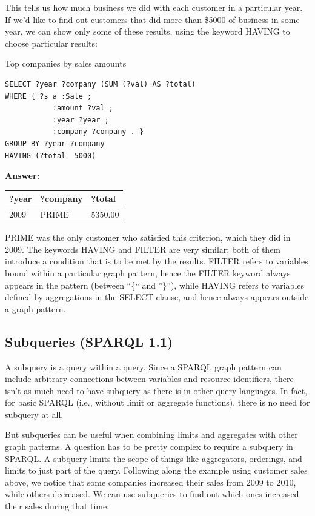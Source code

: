 This tells us how much business we did with each customer in a
particular year. If we'd like to find out customers that did more than
\$5000 of business in some year, we can show only some of these results,
using the keyword HAVING to choose particular results:

\begin{query}Top companies by sales amounts\end{query}

\begin{lstlisting}
SELECT ?year ?company (SUM (?val) AS ?total)
WHERE { ?s a :Sale ;
           :amount ?val ;
           :year ?year ;
           :company ?company . }
GROUP BY ?year ?company
HAVING (?total  5000)
\end{lstlisting}

\textbf{\textbf{Answer:}}

\begin{tabular}{|lll|}
\hline
?year&?company&?total\\
\hline
2009&PRIME&5350.00\\
\hline
\end{tabular}

PRIME was the only customer who satisfied this criterion, which they did
in 2009. The keywords HAVING and FILTER are very similar; both of them
introduce a condition that is to be met by the results. FILTER refers to
variables bound within a particular graph pattern, hence the FILTER
keyword always appears in the pattern (between ``\{`` and ''\}''), while
HAVING refers to variables defined by aggregations in the SELECT clause,
and hence always appears outside a graph pattern.

\subsection{Subqueries (SPARQL 1.1)}

A subquery is a query within a query. Since a SPARQL graph pattern can
include arbitrary connections between variables and resource
identifiers, there isn't as much need to have subquery as there is in
other query languages. In fact, for basic SPARQL (i.e., without limit or
aggregate functions), there is no need for subquery at all.

But subqueries can be useful when combining limits and aggregates with
other graph patterns. A question has to be pretty complex to require a
subquery in SPARQL. A subquery limits the scope of things like
aggregators, orderings, and limits to just part of the query. Following
along the example using customer sales above, we notice that some
companies increased their sales from 2009 to 2010, while others
decreased. We can use subqueries to find out which ones increased their
sales during that time:

